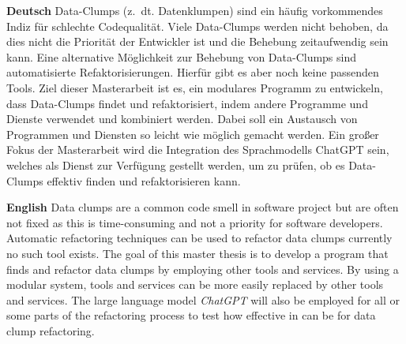 \textbf{Deutsch}
Data-Clumps (z.~dt. Datenklumpen) sind ein häufig vorkommendes Indiz für schlechte Codequalität. Viele Data-Clumps werden nicht behoben, da dies nicht die Priorität der Entwickler ist und die Behebung zeitaufwendig sein kann. Eine alternative Möglichkeit zur Behebung von Data-Clumps sind automatisierte Refaktorisierungen. Hierfür gibt es aber noch keine passenden Tools. Ziel dieser Masterarbeit ist es, ein modulares Programm zu entwickeln, dass Data-Clumps findet und refaktorisiert, indem andere Programme und Dienste verwendet und kombiniert werden. Dabei soll ein Austausch von Programmen und Diensten so leicht wie möglich gemacht werden. Ein großer Fokus der Masterarbeit wird die Integration des Sprachmodells ChatGPT sein, welches als Dienst zur Verfügung gestellt werden, um zu prüfen, ob es Data-Clumps effektiv finden und refaktorisieren kann.

\bigskip

\noindent
\textbf{English} 
Data clumps are a common code smell in software project but are often not fixed as this is time-consuming and not a priority for software developers. Automatic refactoring techniques can be used to refactor data clumps currently no such tool exists. The goal of this master thesis is to develop a program that finds and refactor data clumps by employing other tools and services. By using a modular system, tools and services can be more easily replaced by other tools and services. The large language model \textit{ChatGPT} will also be employed for all or some parts of the refactoring process to test how effective in can be for data clump refactoring. 
\begin{comment}
The software documentation has become an integral part of software development. Nevertheless, the quality of the documentation is often poor and developers are often not motivated to write good documentation. The goal of this thesis is to develop a tool that can analyze the documentation quality of Java applications by applying different metrics (percentage of documented components in all components, Flesch score, coherence, not mentioning the handling of edge cases). This tool will be integrated in GitHub Actions to warn the developer about poor software documentation quality and to prevent a merge if the quality becomes too poor.  
\end{comment}
